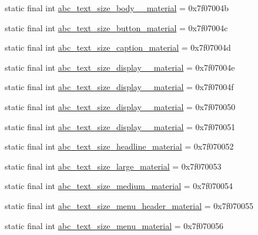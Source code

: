 \begin{CompactItemize}
\item 
static final int \hyperlink{classandroid_1_1support_1_1fragment_1_1_r_1_1dimen_fcc5a48d9386c5e66b12cc19519547fd}{abc\_\-text\_\-size\_\-body\_\_\-material} = 0x7f07004b
\item 
static final int \hyperlink{classandroid_1_1support_1_1fragment_1_1_r_1_1dimen_945e7df9bbc5d525111fe08bfa0d4546}{abc\_\-text\_\-size\_\-button\_\-material} = 0x7f07004c
\item 
static final int \hyperlink{classandroid_1_1support_1_1fragment_1_1_r_1_1dimen_43401ad43ca6d06825c762fe1a44ee6d}{abc\_\-text\_\-size\_\-caption\_\-material} = 0x7f07004d
\item 
static final int \hyperlink{classandroid_1_1support_1_1fragment_1_1_r_1_1dimen_c574c58c5e990403ad6774b243fdee37}{abc\_\-text\_\-size\_\-display\_\_\-material} = 0x7f07004e
\item 
static final int \hyperlink{classandroid_1_1support_1_1fragment_1_1_r_1_1dimen_f49ad9ae7e144943a7861fda5173d721}{abc\_\-text\_\-size\_\-display\_\_\-material} = 0x7f07004f
\item 
static final int \hyperlink{classandroid_1_1support_1_1fragment_1_1_r_1_1dimen_e39e5aacdf0afc422b7be0a33dff4456}{abc\_\-text\_\-size\_\-display\_\_\-material} = 0x7f070050
\item 
static final int \hyperlink{classandroid_1_1support_1_1fragment_1_1_r_1_1dimen_fc7b6d3c97bef85fd923f739ba8603bc}{abc\_\-text\_\-size\_\-display\_\_\-material} = 0x7f070051
\item 
static final int \hyperlink{classandroid_1_1support_1_1fragment_1_1_r_1_1dimen_282709be1a7d150849d5134c9012af73}{abc\_\-text\_\-size\_\-headline\_\-material} = 0x7f070052
\item 
static final int \hyperlink{classandroid_1_1support_1_1fragment_1_1_r_1_1dimen_90b987c938882924de3cc39f8b18a71d}{abc\_\-text\_\-size\_\-large\_\-material} = 0x7f070053
\item 
static final int \hyperlink{classandroid_1_1support_1_1fragment_1_1_r_1_1dimen_9fe38ee0e46baed03e6a67f5405314c6}{abc\_\-text\_\-size\_\-medium\_\-material} = 0x7f070054
\item 
static final int \hyperlink{classandroid_1_1support_1_1fragment_1_1_r_1_1dimen_d7532940c882b992179fff5085296e9a}{abc\_\-text\_\-size\_\-menu\_\-header\_\-material} = 0x7f070055
\item 
static final int \hyperlink{classandroid_1_1support_1_1fragment_1_1_r_1_1dimen_2e915782f477d249d4c8d9d0ad8d80c6}{abc\_\-text\_\-size\_\-menu\_\-material} = 0x7f070056

\end{CompactItemize}
